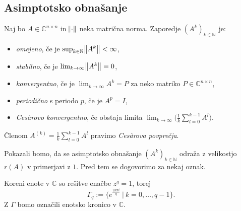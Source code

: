 \documentclass[mat1]{fmfdelo}
\newcommand{\N}{\mathbb N}
\newcommand{\C}{\mathbb C}
\begin{document}
\subsection{Asimptotsko obnašanje}
\begin{definicija}
    Naj bo $A \in \C^{n\times n}$ in $\norm{\cdot}$ neka matrična norma. Zaporedje $(A^k)_{k\in\N}$ je:
    \begin{itemize}
        \item \emph{omejeno}, če je $\sup_{k\in \N} \norm{A^k} < \infty$,
        \item \emph{stabilno}, če je $\lim_{k \rightarrow \infty} \norm{A^k} = 0$,
        \item \emph{konvergentno}, če je $\lim_{k \rightarrow \infty} A^k = P$ za neko matriko $P \in \C^{n \times n}$,
        \item \emph{periodično} s periodo $p$, če je $A^p = I$,
        \item \emph{Ces\`arovo konvergentno}, če obstaja limita $\lim_{k \rightarrow \infty} \Big(\frac{1}{k}\sum_{l=0}^{k-1} A^l\Big)$.
    \end{itemize}
    Členom $A^{(k)} = \frac{1}{k}\sum_{l=0}^{k-1} A^l$ pravimo \emph{Ces\`arova povprečja}.
\end{definicija}
Pokazali bomo, da se asimptotsko obnašanje $(A^k)_{k\in\N}$ odraža z velikostjo $r(A)$ v primerjavi z $1$. Pred tem se dogovorimo za nekaj oznak.

Koreni enote v $\C$ so rešitve enačbe $z^q = 1$, torej
\begin{equation*}
    \Gamma_q := \{e^{\frac{2 k \pi i}{q}}\ |\ k = 0, \ldots, q - 1\}.
\end{equation*}
Z $\Gamma$ bomo označili enotsko kronico v $\C$.
\end{document}
